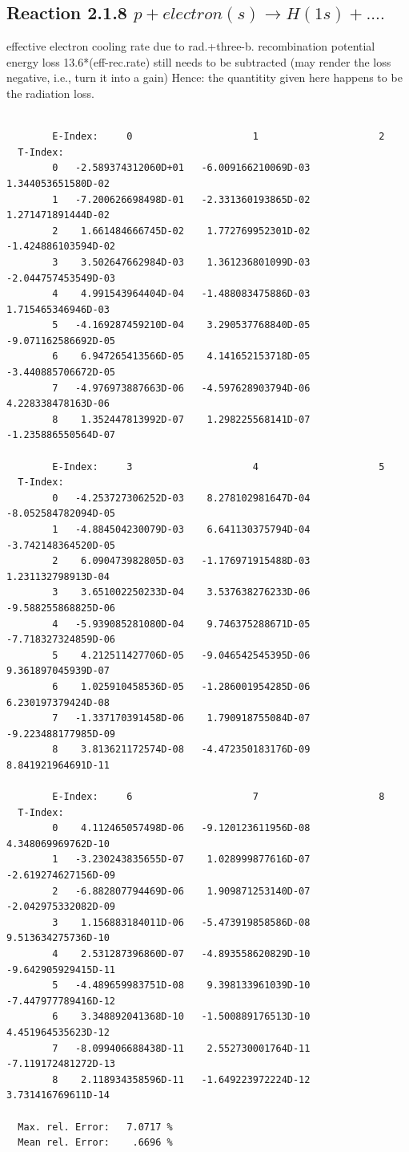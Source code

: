 \documentclass[12pt,dvips]{article}
\begin{document}
\subsection{
  Reaction 2.1.8  $p + electron(s)  \rightarrow H(1s) + ....$
}

   effective electron cooling rate due to rad.+three-b. recombination
   potential energy loss 13.6*(eff-rec.rate) still needs to be
   subtracted (may render the loss negative, i.e., turn it into a gain)
   Hence: the quantitity given here happens to be the radiation loss.

\begin{small}\begin{verbatim}

        E-Index:     0                     1                     2
  T-Index:
        0   -2.589374312060D+01   -6.009166210069D-03    1.344053651580D-02
        1   -7.200626698498D-01   -2.331360193865D-02    1.271471891444D-02
        2    1.661484666745D-02    1.772769952301D-02   -1.424886103594D-02
        3    3.502647662984D-03    1.361236801099D-03   -2.044757453549D-03
        4    4.991543964404D-04   -1.488083475886D-03    1.715465346946D-03
        5   -4.169287459210D-04    3.290537768840D-05   -9.071162586692D-05
        6    6.947265413566D-05    4.141652153718D-05   -3.440885706672D-05
        7   -4.976973887663D-06   -4.597628903794D-06    4.228338478163D-06
        8    1.352447813992D-07    1.298225568141D-07   -1.235886550564D-07

        E-Index:     3                     4                     5
  T-Index:
        0   -4.253727306252D-03    8.278102981647D-04   -8.052584782094D-05
        1   -4.884504230079D-03    6.641130375794D-04   -3.742148364520D-05
        2    6.090473982805D-03   -1.176971915488D-03    1.231132798913D-04
        3    3.651002250233D-04    3.537638276233D-06   -9.588255868825D-06
        4   -5.939085281080D-04    9.746375288671D-05   -7.718327324859D-06
        5    4.212511427706D-05   -9.046542545395D-06    9.361897045939D-07
        6    1.025910458536D-05   -1.286001954285D-06    6.230197379424D-08
        7   -1.337170391458D-06    1.790918755084D-07   -9.223488177985D-09
        8    3.813621172574D-08   -4.472350183176D-09    8.841921964691D-11

        E-Index:     6                     7                     8
  T-Index:
        0    4.112465057498D-06   -9.120123611956D-08    4.348069969762D-10
        1   -3.230243835655D-07    1.028999877616D-07   -2.619274627156D-09
        2   -6.882807794469D-06    1.909871253140D-07   -2.042975332082D-09
        3    1.156883184011D-06   -5.473919858586D-08    9.513634275736D-10
        4    2.531287396860D-07   -4.893558620829D-10   -9.642905929415D-11
        5   -4.489659983751D-08    9.398133961039D-10   -7.447977789416D-12
        6    3.348892041368D-10   -1.500889176513D-10    4.451964535623D-12
        7   -8.099406688438D-11    2.552730001764D-11   -7.119172481272D-13
        8    2.118934358596D-11   -1.649223972224D-12    3.731416769611D-14

  Max. rel. Error:   7.0717 %
  Mean rel. Error:    .6696 %


\end{verbatim}\end{small}
\end{document}
